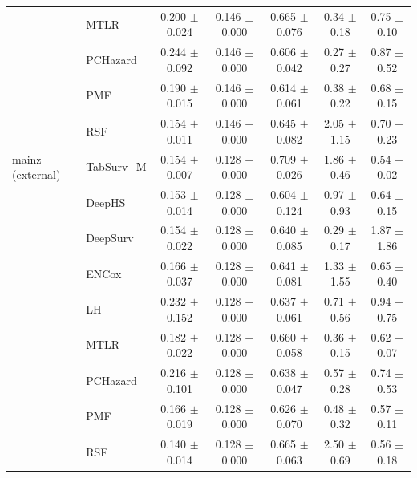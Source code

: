 \begin{longtable}{llccccc}
 & MTLR & 0.200 $\pm$ 0.024 & 0.146 $\pm$ 0.000 & 0.665 $\pm$ 0.076 & 0.34 $\pm$ 0.18 & 0.75 $\pm$ 0.10 \\
 & PCHazard & 0.244 $\pm$ 0.092 & 0.146 $\pm$ 0.000 & 0.606 $\pm$ 0.042 & 0.27 $\pm$ 0.27 & 0.87 $\pm$ 0.52 \\
 & PMF & 0.190 $\pm$ 0.015 & 0.146 $\pm$ 0.000 & 0.614 $\pm$ 0.061 & 0.38 $\pm$ 0.22 & 0.68 $\pm$ 0.15 \\
 & RSF & 0.154 $\pm$ 0.011 & 0.146 $\pm$ 0.000 & 0.645 $\pm$ 0.082 & 2.05 $\pm$ 1.15 & 0.70 $\pm$ 0.23 \\
\midrule
mainz (external) & TabSurv\_M & 0.154 $\pm$ 0.007 & 0.128 $\pm$ 0.000 & 0.709 $\pm$ 0.026 & 1.86 $\pm$ 0.46 & 0.54 $\pm$ 0.02 \\
 & DeepHS & 0.153 $\pm$ 0.014 & 0.128 $\pm$ 0.000 & 0.604 $\pm$ 0.124 & 0.97 $\pm$ 0.93 & 0.64 $\pm$ 0.15 \\
 & DeepSurv & 0.154 $\pm$ 0.022 & 0.128 $\pm$ 0.000 & 0.640 $\pm$ 0.085 & 0.29 $\pm$ 0.17 & 1.87 $\pm$ 1.86 \\
 & ENCox & 0.166 $\pm$ 0.037 & 0.128 $\pm$ 0.000 & 0.641 $\pm$ 0.081 & 1.33 $\pm$ 1.55 & 0.65 $\pm$ 0.40 \\
 & LH & 0.232 $\pm$ 0.152 & 0.128 $\pm$ 0.000 & 0.637 $\pm$ 0.061 & 0.71 $\pm$ 0.56 & 0.94 $\pm$ 0.75 \\
 & MTLR & 0.182 $\pm$ 0.022 & 0.128 $\pm$ 0.000 & 0.660 $\pm$ 0.058 & 0.36 $\pm$ 0.15 & 0.62 $\pm$ 0.07 \\
 & PCHazard & 0.216 $\pm$ 0.101 & 0.128 $\pm$ 0.000 & 0.638 $\pm$ 0.047 & 0.57 $\pm$ 0.28 & 0.74 $\pm$ 0.53 \\
 & PMF & 0.166 $\pm$ 0.019 & 0.128 $\pm$ 0.000 & 0.626 $\pm$ 0.070 & 0.48 $\pm$ 0.32 & 0.57 $\pm$ 0.11 \\
 & RSF & 0.140 $\pm$ 0.014 & 0.128 $\pm$ 0.000 & 0.665 $\pm$ 0.063 & 2.50 $\pm$ 0.69 & 0.56 $\pm$ 0.18 \\
\bottomrule
\end{longtable}
